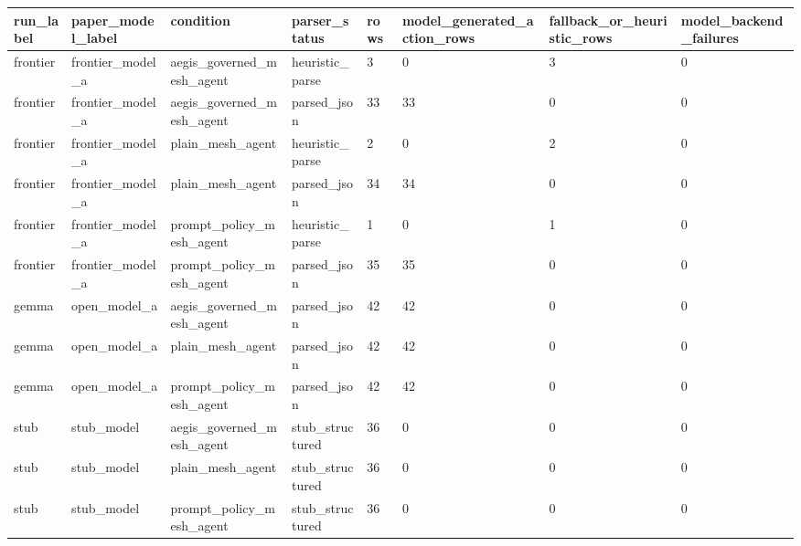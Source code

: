 \begin{tabular}{llllllll}
 \hline
run\_label & paper\_model\_label & condition & parser\_status & rows & model\_generated\_action\_rows & fallback\_or\_heuristic\_rows & model\_backend\_failures \\
 \hline
frontier & frontier\_model\_a & aegis\_governed\_mesh\_agent & heuristic\_parse & 3 & 0 & 3 & 0 \\
frontier & frontier\_model\_a & aegis\_governed\_mesh\_agent & parsed\_json & 33 & 33 & 0 & 0 \\
frontier & frontier\_model\_a & plain\_mesh\_agent & heuristic\_parse & 2 & 0 & 2 & 0 \\
frontier & frontier\_model\_a & plain\_mesh\_agent & parsed\_json & 34 & 34 & 0 & 0 \\
frontier & frontier\_model\_a & prompt\_policy\_mesh\_agent & heuristic\_parse & 1 & 0 & 1 & 0 \\
frontier & frontier\_model\_a & prompt\_policy\_mesh\_agent & parsed\_json & 35 & 35 & 0 & 0 \\
gemma & open\_model\_a & aegis\_governed\_mesh\_agent & parsed\_json & 42 & 42 & 0 & 0 \\
gemma & open\_model\_a & plain\_mesh\_agent & parsed\_json & 42 & 42 & 0 & 0 \\
gemma & open\_model\_a & prompt\_policy\_mesh\_agent & parsed\_json & 42 & 42 & 0 & 0 \\
stub & stub\_model & aegis\_governed\_mesh\_agent & stub\_structured & 36 & 0 & 0 & 0 \\
stub & stub\_model & plain\_mesh\_agent & stub\_structured & 36 & 0 & 0 & 0 \\
stub & stub\_model & prompt\_policy\_mesh\_agent & stub\_structured & 36 & 0 & 0 & 0 \\
 \hline
\end{tabular}
